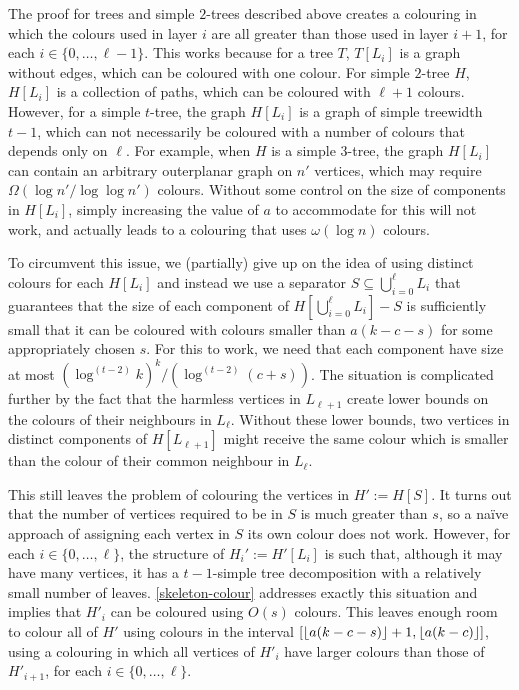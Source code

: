 \documentclass[kpfonts]{patmorin}
\theoremstyle{named}
\begin{document}
The proof for trees and simple $2$-trees described above creates a colouring in which the colours used in layer $i$ are all greater than those used in layer $i+1$, for each $i\in\{0,\ldots,\ell-1\}$.  This works because for a tree $T$, $T[L_i]$ is a graph without edges, which can be coloured with one colour.  For simple $2$-tree $H$, $H[L_i]$ is a collection of paths, which can be coloured with $\ell+1$ colours.  However, for a simple $t$-tree, the graph $H[L_i]$ is a graph of simple treewidth $t-1$, which can not necessarily be coloured with a number of colours that depends only on $\ell$.  For example, when $H$ is a simple $3$-tree, the graph $H[L_i]$ can contain an arbitrary outerplanar graph on $n'$ vertices, which may require $\Omega(\log n'/\log\log n')$ colours.  Without some control on the size of components in $H[L_i]$, simply  increasing the value of $a$ to accommodate for this will not work, and actually leads to a colouring that uses $\omega(\log n)$ colours.

To circumvent this issue, we (partially) give up on the idea of using distinct colours for each $H[L_i]$ and instead we use a separator $S\subseteq \bigcup_{i=0}^\ell L_i$ that guarantees that the size of each component of $H[\bigcup_{i=0}^\ell L_i]-S$ is sufficiently small that it can be coloured with colours smaller than $a(k-c-s)$ for some appropriately chosen $s$. For this to work, we need that each component have size at most $(\log^{(t-2)} k)^k/(\log^{(t-2)}(c+s))$.  The situation is complicated further by the fact that the harmless vertices in $L_{\ell+1}$ create lower bounds on the colours of their neighbours in $L_\ell$.  Without these lower bounds, two vertices in distinct components of $H[L_{\ell+1}]$ might receive the same colour which is smaller than the colour of their common neighbour in $L_\ell$.

This still leaves the problem of colouring the vertices in $H':=H[S]$.  It turns out that the number of vertices required to be in $S$ is much greater than $s$, so a na\"ive approach of assigning each vertex in $S$ its own colour does not work.  However, for each $i\in\{0,\ldots,\ell\}$, the structure of $H_i':=H'[L_i]$ is such that, although it may have many vertices, it has a $t-1$-simple tree decomposition with a relatively small number of leaves. \cref{skeleton-colour} addresses exactly this situation and implies that $H'_i$ can be coloured using $O(s)$ colours.  This leaves enough room to colour all of $H'$ using colours in the interval $[{\lfloor a(k-c-s) \rfloor}+1,{\lfloor a(k-c) \rfloor}]$, using a colouring in which all vertices of $H'_i$ have larger colours than those of $H'_{i+1}$, for each $i\in\{0,\ldots,\ell\}$.
\end{document}
